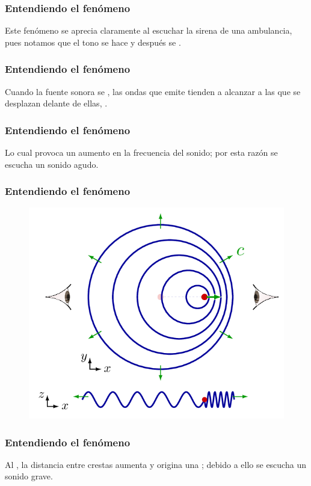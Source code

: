 \documentclass[14pt]{beamer}
\begin{document}
\begin{frame}
\frametitle{Entendiendo el fenómeno}
Este fenómeno se aprecia claramente al escuchar la sirena de una ambulancia, \pause pues notamos que el tono se hace  \pause y después se .
\end{frame}
\begin{frame}
\frametitle{Entendiendo el fenómeno}
Cuando la fuente sonora se , las ondas que emite tienden a alcanzar a las que se desplazan delante de ellas, \pause {}.
\end{frame}
\begin{frame}
\frametitle{Entendiendo el fenómeno}
Lo cual provoca un aumento en la frecuencia del sonido; por esta razón se escucha un sonido agudo.
\end{frame}
\begin{frame}
\frametitle{Entendiendo el fenómeno}
\vspace*{-1cm}
\begin{figure}
    \centering
    \includegraphics[scale=0.35]{Imagenes/Efecto_Doppler_02.png}
\end{figure}
\end{frame}
\begin{frame}
\frametitle{Entendiendo el fenómeno}
Al , la distancia entre crestas aumenta y origina una ; \pause debido a ello se escucha un sonido grave.
\end{frame}
\end{document}
